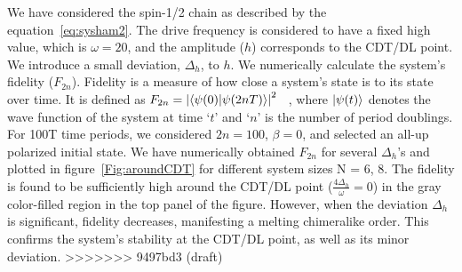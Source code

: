 \documentclass[12pt]{iopart}
\begin{document}
We have considered the spin-1/2 chain as described by the equation~\ref{eq:sysham2}. The drive frequency is considered to have a fixed high value, which is $\omega=20$, and the amplitude ($h$) corresponds to the CDT/DL point. We introduce a small deviation, $\Delta_h$, to $h$. We numerically calculate the system's fidelity ($F_{2n}$). Fidelity is a measure of how close a system's state is to its state over time. It is defined as $F_{2n} = \abs{\braket{\psi(0)}{\psi (2nT)}}^2$ ~\cite{Jozsa1994,Liu2023}, where $\ket{\psi(t)}$ denotes the wave function of the system at time `$t$' and `$n$' is the number of period doublings. For 100T time periods, we considered $2n=100$, $\beta=0$, and selected an all-up polarized initial state. We have numerically obtained $F_{2n}$ for several $\Delta_h$'s and plotted in figure~\ref{Fig:aroundCDT} for different system sizes N = 6, 8. The fidelity is found to be sufficiently high around the CDT/DL point ($\frac{4\Delta_h}{\omega} = 0$) in the gray color-filled region in the top panel of the figure. However, when the deviation $\Delta_h$ is significant, fidelity decreases, manifesting a melting chimeralike order. This confirms the system's stability at the CDT/DL point, as well as its minor deviation.
>>>>>>> 9497bd3 (draft)



\end{document}
